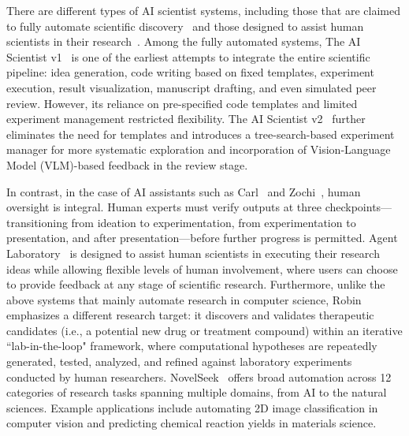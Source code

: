 \documentclass[10pt]{article}
\begin{document}
There are different types of AI scientist systems, including those that are claimed to fully automate scientific discovery~\citep{lu2024aiscientistfullyautomated, yamada2025aiscientistv2workshoplevelautomated} and those designed to assist human scientists in their research~\citep{schmidgall2025agentlaboratoryusingllm,  autoscience2025carl, novelseekteam2025novelseekagentscientist, zochi2025, ghareeb2025robinmultiagentautomatingscientific}. 
Among the fully automated systems, The AI Scientist v1~\citep{lu2024aiscientistfullyautomated} is one of the earliest attempts to integrate the entire scientific pipeline: idea generation, code writing based on fixed templates, experiment execution, result visualization, manuscript drafting, and even simulated peer review. However, its reliance on pre-specified code templates and limited experiment management restricted flexibility. The AI Scientist v2~\citep{yamada2025aiscientistv2workshoplevelautomated} further eliminates the need for templates and introduces a tree-search-based experiment manager for more systematic exploration and incorporation of Vision-Language Model (VLM)-based feedback in the review stage. 

In contrast, in the case of AI assistants such as Carl~\citep{autoscience2025carl} and Zochi~\citep{zochi2025}, human oversight is integral. Human experts must verify outputs at three checkpoints—transitioning from ideation to experimentation, from experimentation to presentation, and after presentation—before further progress is permitted.
Agent Laboratory~\citep{schmidgall2025agentlaboratoryusingllm} is designed to assist human scientists in executing their research ideas while allowing flexible levels of human involvement, where users can choose to provide feedback at any stage of scientific research.
Furthermore, unlike the above systems that mainly automate research in computer science, Robin~\citep{ghareeb2025robinmultiagentautomatingscientific} emphasizes a different research target: it discovers and validates therapeutic candidates (i.e., a potential new drug or treatment compound) within an iterative ``lab-in-the-loop" framework, where computational hypotheses are repeatedly generated, tested, analyzed, and refined against laboratory experiments conducted by human researchers.
NovelSeek~\citep{novelseekteam2025novelseekagentscientist} offers broad automation across 12 categories of research tasks spanning multiple domains, from AI to the natural sciences. Example applications include automating 2D image classification in computer vision and predicting chemical reaction yields in materials science.
\end{document}
